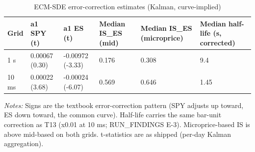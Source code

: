 \begin{table}[htbp]\centering
\caption{ECM-SDE error-correction estimates (Kalman, curve-implied)}
\label{tab:t14}
\small
\begin{tabular}{llllll}
\toprule
Grid & a1 SPY (t) & a1 ES (t) & Median IS\_ES (mid) & Median IS\_ES (microprice) & Median half-life (s, corrected) \\
\midrule
1 s & 0.00067 (0.30) & -0.00972 (-3.33) & 0.176 & 0.308 & 9.4 \\
10 ms & 0.00022 (3.68) & -0.00024 (-6.07) & 0.569 & 0.646 & 1.45 \\
\bottomrule
\end{tabular}
\begin{minipage}{\linewidth}\vspace{2pt}\footnotesize\emph{Notes:} Signs are the textbook error-correction pattern (SPY adjusts up toward, ES down toward, the common curve). Half-life carries the same bar-unit correction as T13 (x0.01 at 10 ms; RUN\_FINDINGS E-3). Microprice-based IS is above mid-based on both grids. t-statistics are as shipped (per-day Kalman aggregation).\end{minipage}
\end{table}
